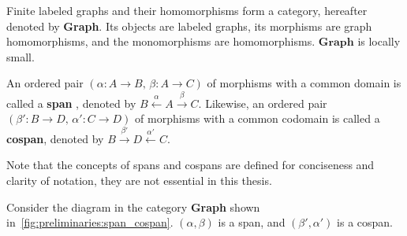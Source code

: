 \begin{example} 
    Finite labeled graphs and their homomorphisms form a category, hereafter denoted by \textbf{Graph}. Its objects are labeled graphs, its morphisms are graph homomorphisms, and the monomorphisms are homomorphisms. 
    $\textbf{Graph}$ is locally small. 
\end{example}

 

\begin{definition}
An ordered pair \((\alpha : A \to B,\, \beta : A \to C)\) of morphisms with a common domain is called a \textbf{span} \cite{lowe2010graph}, denoted by
\(
B \overset{\alpha}{\leftarrow} A \overset{\beta}{\rightarrow} C
\). 
Likewise, an ordered pair \((\beta' : B \to D,\, \alpha' : C \to D)\) of morphisms with a common codomain is called a \textbf{cospan}, denoted by
\(
B \overset{\beta'}{\rightarrow} D \overset{\alpha'}{\leftarrow} C
\). 
\end{definition}
Note that the concepts of spans and cospans are defined for conciseness and clarity of notation, they are not essential in this thesis.
\begin{example}
Consider the diagram in the category \textbf{Graph} shown in~\autoref{fig:preliminaries:span_cospan}. $(\alpha, \beta)$ is a span, and $(\beta', \alpha')$ is a cospan.
\end{example}



